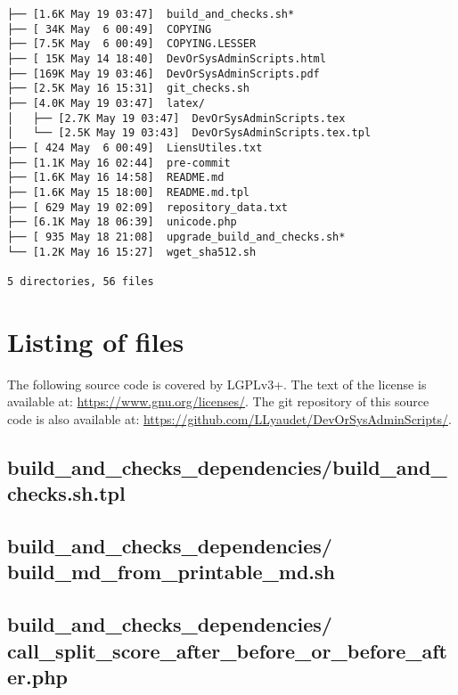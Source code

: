 \documentclass{article}
\begin{document}
\begin{verbatim}
├── [1.6K May 19 03:47]  build_and_checks.sh*
├── [ 34K May  6 00:49]  COPYING
├── [7.5K May  6 00:49]  COPYING.LESSER
├── [ 15K May 14 18:40]  DevOrSysAdminScripts.html
├── [169K May 19 03:46]  DevOrSysAdminScripts.pdf
├── [2.5K May 16 15:31]  git_checks.sh
├── [4.0K May 19 03:47]  latex/
│   ├── [2.7K May 19 03:47]  DevOrSysAdminScripts.tex
│   └── [2.5K May 19 03:43]  DevOrSysAdminScripts.tex.tpl
├── [ 424 May  6 00:49]  LiensUtiles.txt
├── [1.1K May 16 02:44]  pre-commit
├── [1.6K May 16 14:58]  README.md
├── [1.6K May 15 18:00]  README.md.tpl
├── [ 629 May 19 02:09]  repository_data.txt
├── [6.1K May 18 06:39]  unicode.php
├── [ 935 May 18 21:08]  upgrade_build_and_checks.sh*
└── [1.2K May 16 15:27]  wget_sha512.sh

5 directories, 56 files
\end{verbatim}

\section{Listing of files}
\label{section:listing}

The following source code is covered by LGPLv3+.
The text of the license is available at:
\url{https://www.gnu.org/licenses/}.
The git repository of this source code is also available at:
\url{https://github.com/LLyaudet/DevOrSysAdminScripts/}.

\subsection{
  build\_and\_checks\_dependencies/build\_and\_checks.sh.tpl
}
\label{
  build_and_checks_dependencies:build_and_checksshtpl
}



\subsection{
  build\_and\_checks\_dependencies/%
build\_md\_from\_printable\_md.sh
}
\label{
  build_and_checks_dependencies:build_md_from_printable_mdsh
}



\subsection{
  build\_and\_checks\_dependencies/%
call\_split\_score\_after\_before\_or\_before\_after.php
}
\label{
  build_and_checks_dependencies:%
call_split_score_after_before_or_before_afterphp
}
\end{document}
